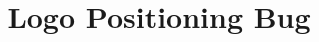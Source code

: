 \documentclass[aspectratio=43]{beamer}
\title{Logo Positioning Bug}
\begin{document}
\begin{frame}
\titlepage
\end{frame}

\begin{frame}[Testframe]
\end{frame}
\end{document}
